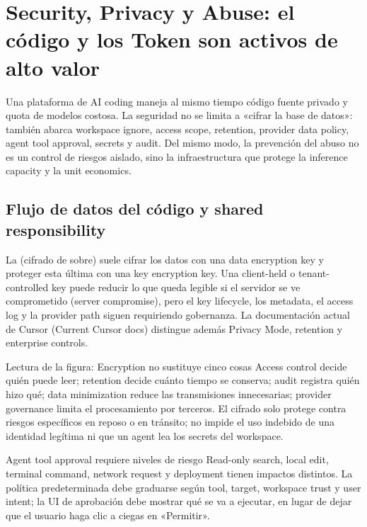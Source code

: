 \section{Security, Privacy y Abuse: el código y los Token son activos de alto valor}

Una plataforma de AI coding maneja al mismo tiempo código fuente privado y quota de modelos costosa. La seguridad no se limita a «cifrar la base de datos»: también abarca workspace ignore, access scope, retention, provider data policy, agent tool approval, secrets y audit. Del mismo modo, la prevención del abuso no es un control de riesgos aislado, sino la infraestructura que protege la inference capacity y la unit economics.

\subsection{Flujo de datos del código y shared responsibility}

La  (cifrado de sobre) suele cifrar los datos con una data encryption key y proteger esta última con una key encryption key. Una client-held o tenant-controlled key puede reducir lo que queda legible si el servidor se ve comprometido (server compromise), pero el key lifecycle, los metadata, el access log y la provider path siguen requiriendo gobernanza. La documentación actual de Cursor (Current Cursor docs) distingue además Privacy Mode, retention y enterprise controls.


\begin{knowledgebox}{Lectura de la figura: Encryption no sustituye cinco cosas}
Access control decide quién puede leer; retention decide cuánto tiempo se conserva; audit registra quién hizo qué; data minimization reduce las transmisiones innecesarias; provider governance limita el procesamiento por terceros. El cifrado solo protege contra riesgos específicos en reposo o en tránsito; no impide el uso indebido de una identidad legítima ni que un agent lea los secrets del workspace.
\end{knowledgebox}

\begin{warningbox}{Agent tool approval requiere niveles de riesgo}
Read-only search, local edit, terminal command, network request y deployment tienen impactos distintos. La política predeterminada debe graduarse según tool, target, workspace trust y user intent; la UI de aprobación debe mostrar qué se va a ejecutar, en lugar de dejar que el usuario haga clic a ciegas en «Permitir».
\end{warningbox}

